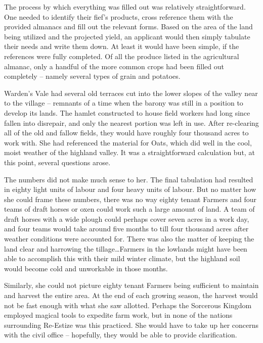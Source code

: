  

The process by which everything was filled out was relatively straightforward. One needed to identify their fief’s products, cross reference them with the provided almanacs and fill out the relevant forms. Based on the area of the land being utilized and the projected yield, an applicant would then simply tabulate their needs and write them down. At least it would have been simple, if the references were fully completed. Of all the produce listed in the agricultural almanac, only a handful of the more common crops had been filled out completely – namely several types of grain and potatoes.

 

Warden’s Vale had several old terraces cut into the lower slopes of the valley near to the village – remnants of a time when the barony was still in a position to develop its lands. The hamlet constructed to house field workers had long since fallen into disrepair, and only the nearest portion was left in use. After re-clearing all of the old and fallow fields, they would have roughly four thousand acres to work with. She had referenced the material for Oats, which did well in the cool, moist weather of the highland valley. It was a straightforward calculation but, at this point, several questions arose.

 

The numbers did not make much sense to her. The final tabulation had resulted in eighty light units of labour and four heavy units of labour. But no matter how she could frame these numbers, there was no way eighty tenant Farmers and four teams of draft horses or oxen could work such a large amount of land. A team of draft horses with a wide plough could perhaps cover seven acres in a work day, and four teams would take around five months to till four thousand acres after weather conditions were accounted for. There was also the matter of keeping the land clear and harrowing the tillage…Farmers in the lowlands might have been able to accomplish this with their mild winter climate, but the highland soil would become cold and unworkable in those months.

 

Similarly, she could not picture eighty tenant Farmers being sufficient to maintain and harvest the entire area. At the end of each growing season, the harvest would not be fast enough with what she saw allotted. Perhaps the Sorcerous Kingdom employed magical tools to expedite farm work, but in none of the nations surrounding Re-Estize was this practiced. She would have to take up her concerns with the civil office – hopefully, they would be able to provide clarification.

